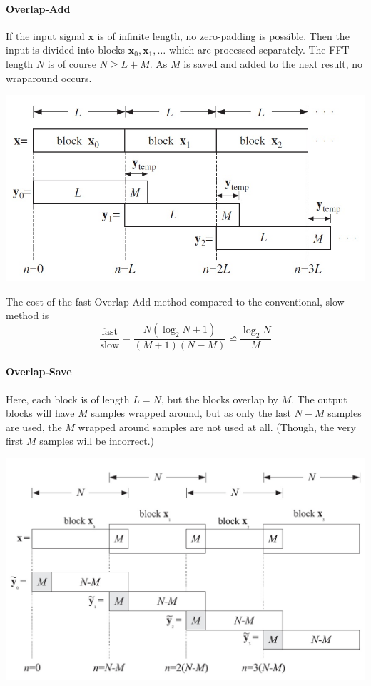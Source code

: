 \paragraph{Overlap-Add}
If the input signal $\mathbf{x}$ is of infinite length, no zero-padding
is possible. Then the input is divided into blocks
$\mathbf{x}_0, \mathbf{x}_1, \ldots$ which are processed separately.
The FFT length $N$ is of course $N \geq L+M$. As $M$ is saved and added
to the next result, no wraparound occurs.

\begin{center}
	\includegraphics[width=0.9\linewidth]{images/DFT_FFT_overlapAdd.jpg}
\end{center}

The cost of the fast Overlap-Add method compared to the conventional, slow
method is
\begin{equation*}
	\frac{\text{fast}}{\text{slow}} = \frac{N (\log_2 N + 1)}{(M+1)(N-M)} \backsimeq \frac{\log_2 N}{M}
\end{equation*}

\paragraph{Overlap-Save}
Here, each block is of length $L=N$, but the blocks overlap by $M$. The output
blocks will have $M$ samples wrapped around, but as only the last $N-M$
samples are used, the $M$ wrapped around samples are not used at all.
(Though, the very first $M$ samples will be incorrect.)
\begin{center}
	\includegraphics[width=0.9\linewidth]{images/DFT_FFT_overlapSave.jpg}
\end{center}
